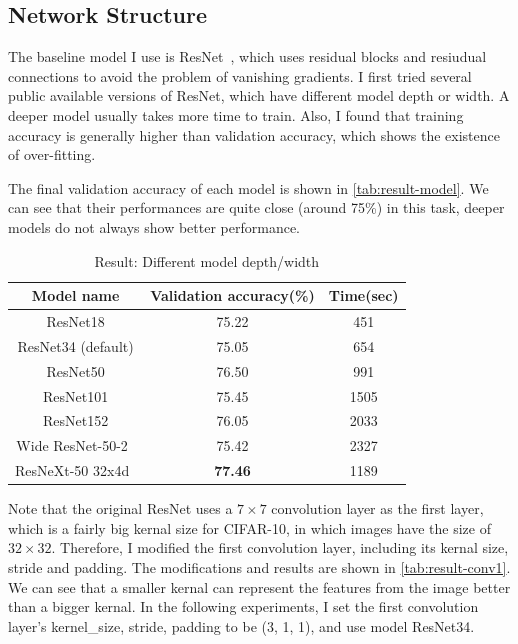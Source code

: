 \documentclass[10pt]{article}
\begin{document}
\subsection{Network Structure}

The baseline model I use is ResNet~\citep{he2016deep}, which uses residual blocks and resiudual connections to avoid the problem of vanishing gradients. I first tried several public available versions of ResNet, which have different model depth or width. A deeper model usually takes more time to train. Also, I found that training accuracy is generally higher than validation accuracy, which shows the existence of over-fitting.

The final validation accuracy of each model is shown in \autoref{tab:result-model}. We can see that their performances are quite close (around 75\%) in this task, deeper models do not always show better performance. 

\begin{table}[htb]
\centering
\caption{Result: Different model depth/width}
\begin{tabular}{c|c|c}
\hline
\textbf{Model name}   & \textbf{Validation accuracy(\%)}    & \textbf{Time(sec)}  \\ \hline
ResNet18     & 75.22     & 451    \\
ResNet34 (default)   &  75.05   & 654     \\
ResNet50       & 76.50    & 991        \\
ResNet101      & 75.45    & 1505      \\
ResNet152        & 76.05   & 2033    \\
Wide ResNet-50-2~\citep{zagoruyko2016wide}  & 75.42 & 2327 \\
ResNeXt-50 32x4d~\citep{xie2017aggregated} & \textbf{77.46} &1189 \\
\hline
\end{tabular}
\label{tab:result-model}
\end{table}

Note that the original ResNet uses a $7\times 7$ convolution layer as the first layer, which is a fairly big kernal size for CIFAR-10, in which images have the size of $32\times 32$. Therefore, I modified the first convolution layer, including its kernal size, stride and padding. 
The modifications and results are shown in \autoref{tab:result-conv1}. We can see that a smaller kernal can represent the features from the image better than a bigger kernal. In the following experiments, I set the first convolution layer's kernel\_size, stride, padding to be (3, 1, 1), and use model ResNet34.
\end{document}
